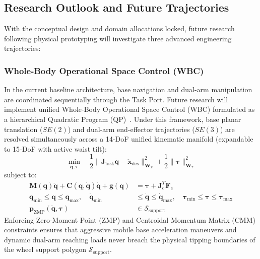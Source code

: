 \subsection{Research Outlook and Future Trajectories}
With the conceptual design and domain allocations locked, future research following physical prototyping will investigate three advanced engineering trajectories:

\subsubsection{Whole-Body Operational Space Control (WBC)}
In the current baseline architecture, base navigation and dual-arm manipulation are coordinated sequentially through the Task Port. Future research will implement unified Whole-Body Operational Space Control (WBC) formulated as a hierarchical Quadratic Program (QP)~\cite{sentis2007wholebody,khatib2004wholebody}. Under this framework, base planar translation ($SE(2)$) and dual-arm end-effector trajectories ($SE(3)$) are resolved simultaneously across a 14-DoF unified kinematic manifold (expandable to 15-DoF with active waist tilt):
\begin{equation}
\min_{\ddot{\mathbf{q}}, \boldsymbol{\tau}} \quad \frac{1}{2} \|\mathbf{J}_{\text{task}} \ddot{\mathbf{q}} - \ddot{\mathbf{x}}_{\text{des}}\|_{\mathbf{W}_x}^2 + \frac{1}{2} \|\boldsymbol{\tau}\|_{\mathbf{W}_\tau}^2
\end{equation}
subject to:
\begin{align}
\mathbf{M}(\mathbf{q})\ddot{\mathbf{q}} + \mathbf{C}(\mathbf{q},\dot{\mathbf{q}})\dot{\mathbf{q}} + \mathbf{g}(\mathbf{q}) &= \boldsymbol{\tau} + \mathbf{J}_c^T \mathbf{F}_c \\
\mathbf{q}_{\min} \le \mathbf{q} \le \mathbf{q}_{\max}, \quad \dot{\mathbf{q}}_{\min} &\le \dot{\mathbf{q}} \le \dot{\mathbf{q}}_{\max}, \quad \boldsymbol{\tau}_{\min} \le \boldsymbol{\tau} \le \boldsymbol{\tau}_{\max} \\
\mathbf{p}_{\text{ZMP}}(\ddot{\mathbf{q}}, \boldsymbol{\tau}) &\in \mathcal{S}_{\text{support}}
\end{align}
Enforcing Zero-Moment Point (ZMP) and Centroidal Momentum Matrix (CMM) constraints ensures that aggressive mobile base acceleration maneuvers and dynamic dual-arm reaching loads never breach the physical tipping boundaries of the wheel support polygon $\mathcal{S}_{\text{support}}$.

